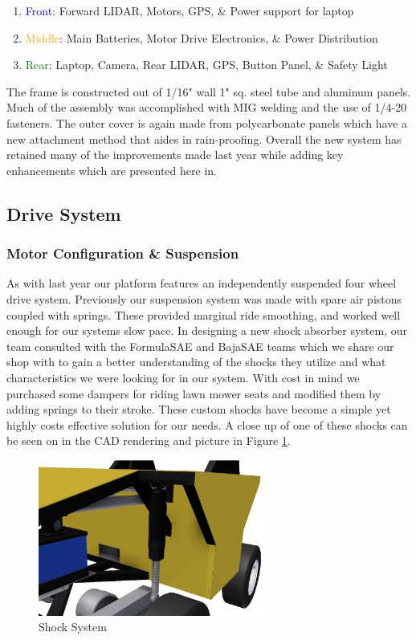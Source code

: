 \begin{enumerate}
\item \textcolor{blue}{Front}: Forward LIDAR, Motors, GPS, \& Power support for laptop
\item \textcolor{Orange}{Middle}: Main Batteries, Motor Drive Electronics, \& Power Distribution
\item \textcolor{green}{Rear}: Laptop, Camera, Rear LIDAR, GPS, Button Panel, \& Safety Light
\end{enumerate}

The frame is constructed out of 1/16" wall 1" sq. steel tube and aluminum panels. Much of the assembly was accomplished with MIG welding and the use of 1/4-20 fasteners. The outer cover is again made from polycarbonate panels which have a new attachment method that aides in rain-proofing. Overall the new system has retained many of the improvements made last year while adding key enhancements which are presented here in. 

\subsection{Drive System}
\subsubsection{Motor Configuration \& Suspension}
As with last year our platform features an independently suspended four wheel drive system. Previously our suspension system was made with spare air pistons coupled with springs. These provided marginal ride smoothing, and worked well enough for our systems slow pace. In designing a new shock absorber system, our team consulted with the FormulaSAE and BajaSAE teams which we share our shop with to gain a better understanding of the shocks they utilize and what characteristics we were looking for in our system. With cost in mind we purchased some dampers for riding lawn mower seats and modified them by adding springs to their stroke. These custom shocks have become a simple yet highly costs effective solution for our needs. A close up of one of these shocks can be seen on in the CAD rendering and picture in Figure \ref{FIG:Shock}.

\begin{figure}[H]
\begin{center}
\includegraphics[width=3in]{./pics/shock.png}
\caption{Shock System}
\label{FIG:Shock}
\end{center}
\end{figure}

